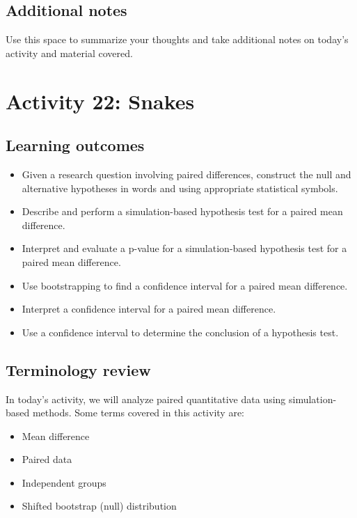 \documentclass[
]{report}
\begin{document}
\subsection{Additional notes}\label{additional-notes-20}

Use this space to summarize your thoughts and take additional notes on today's activity and material covered.

\newpage

\section{Activity 22: Snakes}\label{activity-22-snakes}


\subsection{Learning outcomes}\label{learning-outcomes-24}

\begin{itemize}
\item
  Given a research question involving paired differences, construct the null and alternative hypotheses
  in words and using appropriate statistical symbols.
\item
  Describe and perform a simulation-based hypothesis test for a paired mean difference.
\item
  Interpret and evaluate a p-value for a simulation-based hypothesis test for a paired mean difference.
\item
  Use bootstrapping to find a confidence interval for a paired mean difference.
\item
  Interpret a confidence interval for a paired mean difference.
\item
  Use a confidence interval to determine the conclusion of a hypothesis test.
\end{itemize}

\subsection{Terminology review}\label{terminology-review-19}

In today's activity, we will analyze paired quantitative data using simulation-based methods. Some terms covered in this activity are:

\begin{itemize}
\item
  Mean difference
\item
  Paired data
\item
  Independent groups
\item
  Shifted bootstrap (null) distribution
\end{itemize}
\end{document}
